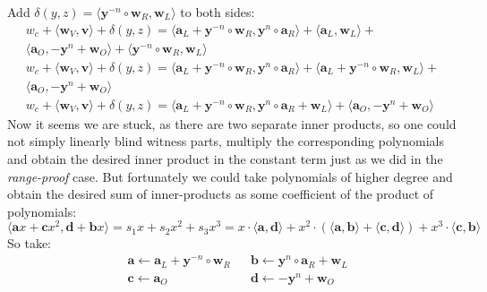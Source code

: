 \documentclass[../../book.tex]{subfiles}
\begin{document}
Add $\delta(y, z) = \langle \mathbf{y}^{-n} \circ \mathbf{w}_R, \mathbf{w}_L \rangle $ to both sides:
$$
\begin{aligned}
w_c + \langle \mathbf{w}_V, \mathbf{v} \rangle +
\delta(y, z) = \langle \mathbf{a}_L + \mathbf{y}^{-n} \circ \mathbf{w}_R, \mathbf{y}^n \circ \mathbf{a}_R \rangle + \langle \mathbf{a}_L, \mathbf{w}_L \rangle +\\
\langle \mathbf{a}_O, -\mathbf{y}^n + \mathbf{w}_O \rangle + 
\langle \mathbf{y}^{-n} \circ \mathbf{w}_R, \mathbf{w}_L \rangle\\
w_c + \langle \mathbf{w}_V, \mathbf{v} \rangle + \delta(y, z)
    = \langle \mathbf{a}_L + \mathbf{y}^{-n} \circ \mathbf{w}_R, 
    \mathbf{y}^n \circ \mathbf{a}_R \rangle + 
    \langle \mathbf{a}_L + \mathbf{y}^{-n} \circ \mathbf{w}_R,
    \mathbf{w}_L \rangle + \\
    \langle \mathbf{a}_O, 
    -\mathbf{y}^n + \mathbf{w}_O \rangle \\
    w_c + \langle \mathbf{w}_V, \mathbf{v} \rangle + \delta(y, z) =
\langle \mathbf{a}_L + \mathbf{y}^{-n} \circ \mathbf{w}_R, \mathbf{y}^n \circ \mathbf{a}_R + \mathbf{w}_L \rangle + \langle \mathbf{a}_O, -\mathbf{y}^n + \mathbf{w}_O \rangle
\end{aligned}
$$
Now it seems we are stuck, as there are two separate inner products, so one could not simply linearly blind witness parts, multiply the corresponding polynomials and obtain the desired inner product in the constant term just as we did in the \textit{range-proof} case. But fortunately we could take polynomials of higher degree and obtain the desired sum of inner-products as some coefficient of the product of polynomials:
\begin{equation}
    \langle \mathbf{a}x + \mathbf{c}x^2, \mathbf{d} + \mathbf{b}x \rangle = s_1x + s_2x^2 + s_3x^3 = x \cdot \langle \mathbf{a}, \mathbf{d} \rangle + x^2 \cdot (\langle \mathbf{a}, \mathbf{b} \rangle + \langle \mathbf{c}, \mathbf{d} \rangle) + x^3 \cdot \langle \mathbf{c}, \mathbf{b} \rangle
    \label{eq:inner-product-circuit-1}
\end{equation}
So take:
\begin{equation}
    \begin{aligned}
    &\mathbf{a} \gets \mathbf{a}_L + \mathbf{y}^{-n} \circ \mathbf{w}_R &&\mathbf{b} \gets \mathbf{y}^n \circ \mathbf{a}_R + \mathbf{w}_L \\
    &\mathbf{c} \gets \mathbf{a}_O &&\mathbf{d} \gets -\mathbf{y}^n + \mathbf{w}_O
    \end{aligned}
    \label{eq:inner-product-circuit-assignment}
\end{equation}
\end{document}
